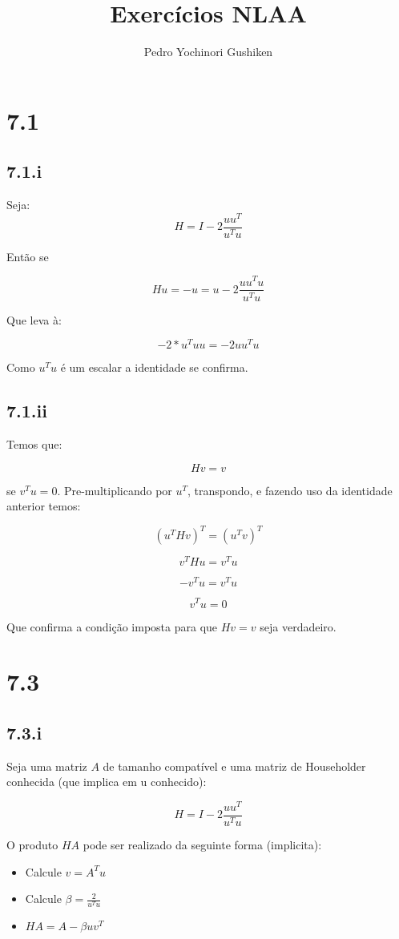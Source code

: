 \documentclass[11pt]{report}
\title{Exercícios NLAA}
\author{Pedro Yochinori Gushiken}
\begin{document}
\maketitle
\chapter*{7.1}

\section*{7.1.i}

Seja:
\[
H = I - 2\frac{uu^T}{u^Tu}
\]

Então se

\[
Hu = -u = u - 2\frac{uu^Tu}{u^Tu}
\]

Que leva à:

\[
-2*u^Tuu = -2uu^Tu
\]

Como $u^Tu$ é um escalar a identidade se confirma.

\section*{7.1.ii}

Temos que:

\[
Hv = v
\]

se $v^Tu = 0$. Pre-multiplicando por $u^T$, transpondo, e fazendo uso da identidade anterior temos:

\[
(u^THv)^T = (u^Tv)^T
\]

\[
v^T H u = v^T u
\]

\[
-v^Tu = v^T u
\]

\[
v^Tu = 0
\]

Que confirma a condição imposta para que $Hv = v$ seja verdadeiro.
\chapter*{7.3}
\section*{7.3.i}
Seja uma matriz $A$ de tamanho compatível e uma matriz de Householder conhecida (que implica em u conhecido):

\[
H = I - 2\frac{uu^T}{u^Tu}
\]

O produto $HA$ pode ser realizado da seguinte forma (implicita):
\begin{itemize}
\item[i)] Calcule $v=A^Tu$
\item[ii)]Calcule $\beta = \frac{2}{u^Tu}$
\item[iii)] $HA = A-\beta u v^T$ 
\end{itemize}
\end{document}
